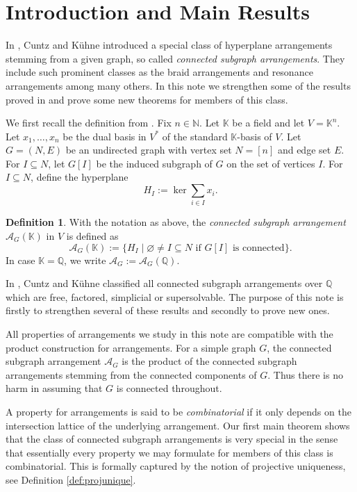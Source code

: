 \documentclass[12pt]{amsart}
\newcommand\CA{{\mathscr A}}
\newcommand\BBK{{\mathbb K}}
\newcommand\BBN{{\mathbb N}}
\newcommand\BBQ{{\mathbb Q}}
\numberwithin{equation}{section}
\theoremstyle{plain}
\theoremstyle{definition}
\newtheorem{defn}[equation]{Definition}
\begin{document}
\section{Introduction and Main Results}

In \cite{cuntzkuehne:subgraphs},
Cuntz and K\"uhne
introduced a special class of hyperplane arrangements stemming from a given graph, so called
\emph{connected subgraph arrangements}.
They include such prominent classes as the braid arrangements and resonance arrangements among many others.
In this note 
we strengthen some of the results proved in \cite{cuntzkuehne:subgraphs}
and prove some new theorems for members of this class.

We first recall the definition from \cite{cuntzkuehne:subgraphs}.
Fix $n \in \BBN$. Let $\BBK$ be a field and let $V = \BBK^n$. Let $x_1, \ldots, x_n$ be the dual basis  in $V^*$ of the standard $\BBK$-basis of $V$.
Let $G = (N,E)$ be an undirected graph with vertex set $N = [n]$ and edge set $E$. For $I \subseteq N$, let $G[I]$ be the induced subgraph of $G$ on the set of vertices $I$.
For $I \subseteq N$, define the hyperplane
\[H_I := \ker \sum_{i \in I}x_i.\]

\begin{defn}
	\label{def:AG} With the notation as above, the \emph{connected subgraph arrangement} $\CA_G(\BBK)$ in $V$ is defined as
	\[\CA_G(\BBK) := \{H_I \mid \varnothing \ne I \subseteq N \text{ if $G[I]$ is connected} \}.
	\]
	In case $\BBK = \BBQ$, we write $\CA_G := \CA_G(\BBQ)$.
\end{defn}

In \cite{cuntzkuehne:subgraphs},
Cuntz and K\"uhne classified all connected subgraph arrangements over $\BBQ$ which are free, factored, simplicial or supersolvable.
The purpose of this note is firstly to strengthen several of these results and secondly to prove new ones.

All properties of arrangements we study in this note are compatible with the product construction for arrangements. For a simple graph $G$, the connected subgraph arrangement $\CA_G$ is the product of the connected subgraph arrangements stemming from the connected components of $G$. Thus there is no harm in assuming that $G$ is connected throughout.

A property for arrangements is said to be \emph{combinatorial} if it only depends on the intersection lattice of the underlying arrangement.
Our first main theorem shows that the class of connected subgraph arrangements is
very special in the sense that essentially every property
we may formulate for members of this class is
combinatorial. This is formally captured by the notion of projective uniqueness, see Definition \ref{def:projunique}.
\end{document}
